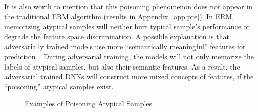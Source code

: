 

It is also worth to mention that this poisoning phenomenon does not appear in the traditional ERM algorithm (results in Appendix~\ref{app:pre}). In ERM, memorizing atypical samples will neither hurt typical sample's performance or degrade the feature space discrimination. A possible explanation is that adversarially trained models use more ``semantically meaningful'' features for prediction~\cite{tsipras2018robustness, ilyas2019adversarial}. During adversarial training, the models will not only memorize the labels of atypical samples, but also their semantic features. As a result, the adversarial trained DNNs will construct more mixed concepts of features, if the ``poisoning'' atypical samples exist.


\begin{figure}[t]
\caption{Examples of Poisoning Atypical Samples}
\vspace{-0.4cm}
\label{fig:atypical_samples}
\end{figure}